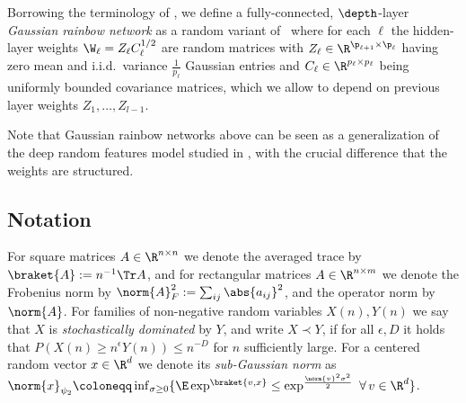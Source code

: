 \begin{definition} 
\label{def:rainbow}
Borrowing the terminology of \cite{guth2023rainbow}, we define a fully-connected, $\depth$-layer \emph{Gaussian rainbow network} as a random variant of~ where for each $\ell$ the hidden-layer weights $\W_{\ell} = Z_{\ell}C_{\ell}^{1/2}$ are random matrices with $Z_{\ell}\in\R^{\p_{\ell+1}\times \p_{\ell}}$ having zero mean and i.i.d.\ variance $\frac{1}{p_\ell}$ Gaussian entries and $C_{\ell}\in\R^{p_{\ell}\times p_{\ell}}$ being uniformly bounded covariance matrices, which we allow to depend on previous layer weights $Z_1,\ldots,Z_{l-1}$. 
\end{definition}
Note that Gaussian rainbow networks above can be seen as a generalization of the deep random features model studied in \cite{schroder2023deterministic, bosch2023precise, Fan2020SpectraOT}, with the crucial difference that the weights are structured. 

\subsection*{Notation}
For square matrices $A\in\R^{n\times n}$ we denote the averaged trace by $\braket{A}:=n^{-1}\Tr A$, and for rectangular matrices $A\in\R^{n\times m}$ we denote the Frobenius norm by $\norm{A}_F^2:=\sum_{ij}\abs{a_{ij}}^2$, and the operator norm by $\norm{A}$. For families of non-negative random variables $X(n),Y(n)$ we say that $X$ is \emph{stochastically dominated} by $Y$, and write $X\prec Y$, if for all $\epsilon,D$ it holds that $P(X(n)\ge n^{\epsilon} Y(n))\le n^{-D}$ for $n$ sufficiently large. For a centered random vector \(x \in \R^d\) we denote its \emph{sub-Gaussian norm} as
        \(\norm{x}_{\psi_2} \coloneqq \inf_{\sigma 
        \geq 0} \{\E \exp^{\braket{v, x}} \leq \exp^{\frac{\norm{v}^2 \sigma^2}{2}}\ \forall\, v \in \R^d\}\).